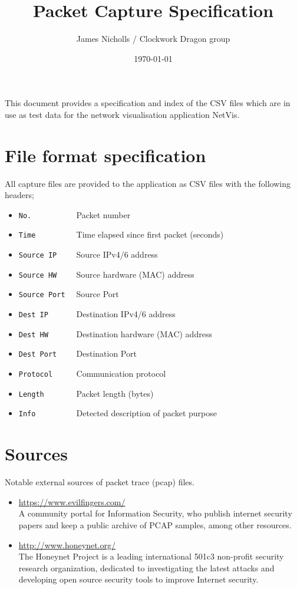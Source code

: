 \documentclass[12pt,a4paper]{article}
\author{James Nicholls / Clockwork Dragon group}
\title{Packet Capture Specification}
\date{\today}
\begin{document}
    \maketitle

    This document provides a specification and index of the CSV files
    which are in use as test data for the network visualisation
    application NetVis.

    \section{File format specification}
        All capture files are provided to the application as CSV files
        with the following headers;

    \begin{itemize}
    \setlength{\itemsep}{0pt}
        \item \verb!No.          ! Packet number
        \item \verb!Time         ! Time elapsed since first packet (seconds)
        \item \verb!Source IP    ! Source IPv4/6 address
        \item \verb!Source HW    ! Source hardware (MAC) address
        \item \verb!Source Port  ! Source Port
        \item \verb!Dest IP      ! Destination IPv4/6 address
        \item \verb!Dest HW      ! Destination hardware (MAC) address
        \item \verb!Dest Port    ! Destination Port
        \item \verb!Protocol     ! Communication protocol
        \item \verb!Length       ! Packet length (bytes)
        \item \verb!Info         ! Detected description of packet purpose
    \end{itemize}

    \section{Sources}

    Notable external sources of packet trace (pcap) files.

    \begin{itemize}
        \item \url{https://www.evilfingers.com/} \\
            A community portal for Information Security, who publish
            internet security papers and keep a public archive of
            PCAP samples, among other resources.

        \item \url{http://www.honeynet.org/} \\
            The Honeynet Project is a leading international 501c3
            non-profit security research organization, dedicated to
            investigating the latest attacks and developing open source
            security tools to improve Internet security.
    \end{itemize}
\end{document}
